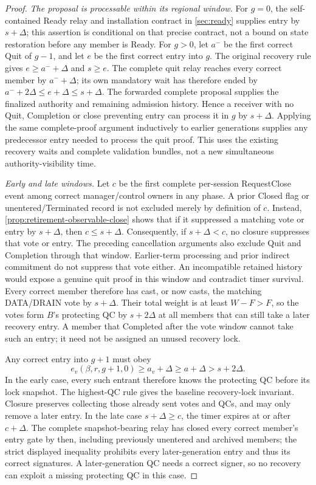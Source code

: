 \begin{proof}
\emph{The proposal is processable within its regional window.}
For $g=0$, the self-contained Ready relay and installation contract
in \cref{sec:ready} supplies entry by $s+\Delta$; this assertion is
conditional on that precise contract, not a bound on state restoration
before any member is Ready. For $g>0$, let $a^-$ be the first correct
Quit of $g-1$, and let $e$ be the first correct entry into $g$.
The original recovery rule gives $e\ge a^-+\Delta$ and $s\ge e$.
The complete quit relay reaches every correct member by $a^-+\Delta$;
its own mandatory wait has therefore ended by
$a^-+2\Delta\le e+\Delta\le s+\Delta$. The forwarded complete
proposal supplies the finalized authority and remaining admission
history. Hence a receiver with no Quit, Completion or close preventing
entry can process it in $g$ by $s+\Delta$. Applying the same
complete-proof argument inductively to earlier generations supplies
any predecessor entry needed to process the quit proof. This uses
the existing recovery waits and complete validation bundles, not a
new simultaneous authority-visibility time.

\emph{Early and late windows.}
Let $c$ be the first complete per-session RequestClose event among
correct manager/control owners in any phase. A prior Closed flag or
unentered/Terminated record is not excluded merely by definition of $c$.
Instead, \cref{prop:retirement-observable-close} shows that if it
suppressed a matching vote or entry by $s+\Delta$, then $c\le s+\Delta$.
Consequently, if $s+\Delta<c$, no closure suppresses that vote or entry.
The preceding cancellation arguments also exclude Quit and Completion
through that window. Earlier-term processing and prior indirect
commitment do not suppress that vote either. An incompatible retained
history would expose a genuine quit proof in this window and contradict
timer survival. Every correct member therefore has cast, or now casts,
the matching DATA/DRAIN vote by $s+\Delta$. Their total weight is at least
$W-F>F$, so the votes form $B$'s protecting QC by $s+2\Delta$ at
all members that can still take a later recovery entry. A member that
Completed after the vote window cannot take such an entry; it need
not be assigned an unused recovery lock.

Any correct entry into $g+1$ must obey
\[
 e_v(\beta,r,g+1,0)\ge a_v+\Delta
 \ge a+\Delta>s+2\Delta.
\]
In the early case, every such entrant therefore knows the protecting
QC before its lock snapshot. The highest-QC rule gives the baseline
recovery-lock invariant. Closure preserves collecting those already
sent votes and QCs, and may only remove a later entry. In the late
case $s+\Delta\ge c$, the timer expires at or after $c+\Delta$.
The complete snapshot-bearing relay has closed every correct member's
entry gate by then, including previously unentered and archived members; the strict displayed
inequality prohibits every later-generation entry and thus its
correct signatures. A later-generation QC needs a correct signer,
so no recovery can exploit a missing protecting QC in this case.


\end{proof}
